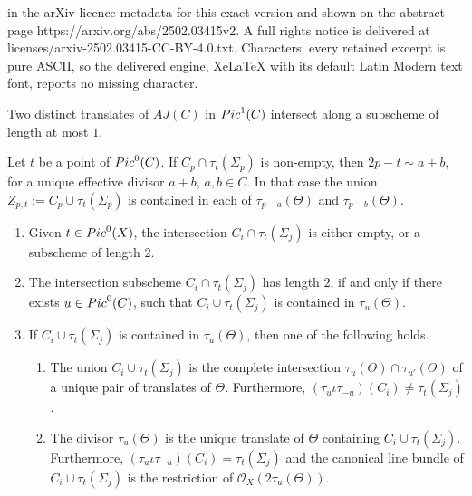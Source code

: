 \documentclass[10pt,a4paper]{amsart}
\newcommand{\Pic}{{\rm Pic}}
\newcommand{\StructureSheaf}[1]{{\mathcal O}_{#1}}
\begin{document}
in the arXiv licence metadata for this exact version and shown on the abstract page https://arxiv.org/abs/2502.03415v2. A full rights notice is delivered at licenses/arxiv-2502.03415-CC-BY-4.0.txt. Characters: every retained excerpt is pure ASCII, so the delivered engine, XeLaTeX with its default Latin Modern text font, reports no missing character.
\begin{lem}
\label{lemma-two-translates-of-C}
Two distinct translates of $AJ(C)$ in $\Pic^1(C)$ intersect along a subscheme of length at most $1$.
\end{lem}

\begin{lem}
\label{lemma-intersection-is-either-empty-or-of-length-2}
Let $t$ be a point of $\Pic^0(C)$. If $C_p\cap \tau_t(\Sigma_p)$ is non-empty, then 
$2p-t\sim a+b$, for a unique effective divisor $a+b$, $a,b\in C$. In that case 
the union $Z_{p,t}:=C_p\cup\tau_t(\Sigma_p)$ is contained in each of 
$\tau_{p-a}(\Theta)$ and $\tau_{p-b}(\Theta)$. 
\end{lem}

\begin{lem}
\label{lemma-intersection-of-C-and-Sigma-has-length-at-most-2}
\begin{enumerate}
\item
\label{lemma-item-length-at-most-2}
Given $t\in \Pic^0(X)$, the intersection $C_i\cap \tau_t(\Sigma_j)$ is either empty, or a subscheme of length $2$.
\item
\label{lemma-item-length-is-2-iff}
The intersection subscheme $C_i\cap \tau_t(\Sigma_j)$ has length $2$, if and only if 
there exists $u\in\Pic^0(C)$, such that $C_i\cup \tau_t(\Sigma_j)$ is contained in $\tau_u(\Theta)$. 
\item
\label{lemma-item-one-or-two-theta-translates}
If  $C_i\cup \tau_t(\Sigma_j)$ is contained in $\tau_u(\Theta)$, then 
one of the following holds.
\begin{enumerate}
\item
\label{case-a-of-intersection-lemma}
The union $C_i\cup \tau_t(\Sigma_j)$ is the complete intersection $\tau_u(\Theta)\cap\tau_{u'}(\Theta)$ 
of a unique pair of translates of $\Theta$. 
Furthermore, $(\tau_u\iota\tau_{-u})(C_i)\neq\tau_t(\Sigma_j)$.
\item
\label{case-b-of-intersection-lemma}
The divisor $\tau_u(\Theta)$ is the unique translate of $\Theta$ containing $C_i\cup \tau_t(\Sigma_j)$. 
Furthermore, $(\tau_u\iota\tau_{-u})(C_i)=\tau_t(\Sigma_j)$ and the canonical line bundle of $C_i\cup \tau_t(\Sigma_j)$ is the restriction of $\StructureSheaf{X}(2\tau_u(\Theta))$.
\end{enumerate}
\end{enumerate}
\end{lem}
\end{document}
